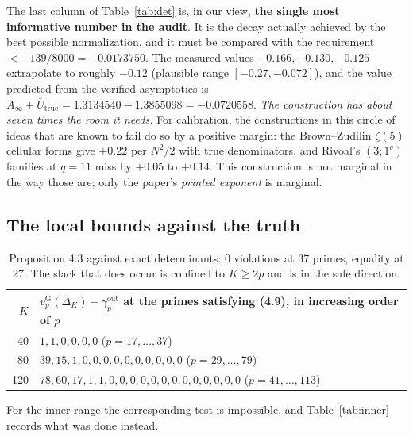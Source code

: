 \documentclass[11pt]{article}
\theoremstyle{definition}
\newcommand{\Ub}{\overline{U}}
\newcommand{\vG}{v_p^{\mathrm{G}}}
\newcommand{\gout}{\gamma_p^{\mathrm{out}}}
\begin{document}
The last column of Table~\ref{tab:det} is, in our view, \textbf{the single most informative
number in the audit}. It is the decay actually achieved by the best possible normalization, and
it must be compared with the requirement $<-139/8000=-0.0173750$. The measured values
$-0.166,-0.130,-0.125$ extrapolate to roughly $-0.12$ (plausible range $[-0.27,-0.072]$), and
the value predicted from the verified asymptotics is
$A_\infty+\Ub_{\mathrm{true}}=1.3134540-1.3855098=-0.0720558$. \emph{The construction has about
seven times the room it needs.} For calibration, the constructions in this circle of ideas that
are known to fail do so by a positive margin: the Brown--Zudilin $\zeta(5)$ cellular forms give
$+0.22$ per $N^2/2$ with true denominators, and Rivoal's $(3;1^q)$ families at $q=11$ miss by
$+0.05$ to $+0.14$. This construction is not marginal in the way those are; only the paper's
\emph{printed exponent} is marginal.

\subsection{The local bounds against the truth}

\begin{table}[htbp]
\centering
\begin{tabular}{@{}rl@{}}
\toprule
$K$ & $\vG(\Delta_K)-\gout$ at the primes satisfying (4.9), in increasing order of $p$ \\
\midrule
40  & $1,1,0,0,0,0$ \hfill ($p=17,\dots,37$) \\
80  & $39,15,1,0,0,0,0,0,0,0,0,0,0$ \hfill ($p=29,\dots,79$) \\
120 & $78,60,17,1,1,0,0,0,0,0,0,0,0,0,0,0,0,0$ \hfill ($p=41,\dots,113$) \\
\bottomrule
\end{tabular}
\caption{Proposition 4.3 against exact determinants: 0 violations at 37 primes, equality at 27.
The slack that does occur is confined to $K\ge2p$ and is in the safe direction.}
\label{tab:gout}
\end{table}

For the inner range the corresponding test is impossible, and Table~\ref{tab:inner} records what
was done instead.
\end{document}
